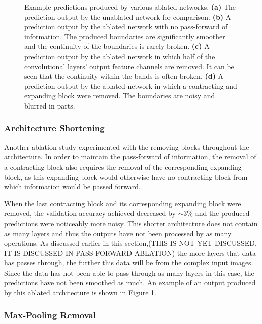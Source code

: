 \begin{figure}[!t]
\begin{subfigure}[t]{0.24\textwidth}
        \caption{}
    \end{subfigure}
    \caption{Example predictions produced by various ablated networks. \textbf{(a)} The prediction output by the unablated network for comparison. \textbf{(b)} A prediction output by the ablated network with no pass-forward of information. The produced boundaries are significantly smoother and the continuity of the boundaries is rarely broken. \textbf{(c)} A prediction output by the ablated network in which half of the convolutional layers' output feature channels are removed. It can be seen that the continuity within the bands is often broken. \textbf{(d)} A prediction output by the ablated network in which a contracting and expanding block were removed. The boundaries are noisy and blurred in parts.}
    \label{fig:ablation}
\end{figure}

\subsubsection{Architecture Shortening}

Another ablation study experimented with the removing blocks throughout the architecture. In order to maintain the pass-forward of information, the removal of a contracting block also requires the removal of the corresponding expanding block, as this expanding block would otherwise have no contracting block from which information would be passed forward.

When the last contracting block and its corresponding expanding block were removed, the validation accuracy achieved decreased by ${\sim}3\%$ and the produced predictions were noticeably more noisy. This shorter architecture does not contain as many layers and thus the outputs have not been processed by as many operations. As discussed earlier in this section,(THIS IS NOT YET DISCUSSED. IT IS DISCUSSED IN PASS-FORWARD ABLATION) the more layers that data has passes through, the further this data will be from the complex input images. Since the data has not been able to pass through as many layers in this case, the predictions have not been smoothed as much. An example of an output produced by this ablated architecture is shown in Figure \ref{fig:ablation}.

\subsubsection{Max-Pooling Removal}

